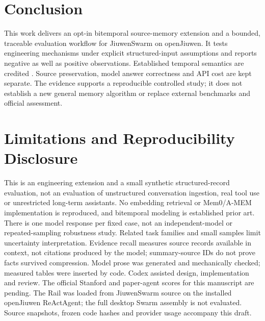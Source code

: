 \documentclass{article}
\begin{document}
\section{Conclusion}
This work delivers an opt-in bitemporal source-memory extension and a bounded, traceable evaluation workflow for JiuwenSwarm on openJiuwen. It tests engineering mechanisms under explicit structured-input assumptions and reports negative as well as positive observations. Established temporal semantics are credited \citep{temporal}. Source preservation, model answer correctness and API cost are kept separate. The evidence supports a reproducible controlled study; it does not establish a new general memory algorithm or replace external benchmarks and official assessment.
\section{Limitations and Reproducibility Disclosure}
This is an engineering extension and a small synthetic structured-record evaluation, not an evaluation of unstructured conversation ingestion, real tool use or unrestricted long-term assistants. No embedding retrieval or Mem0/A-MEM implementation is reproduced, and bitemporal modeling is established prior art. There is one model response per fixed case, not an independent-model or repeated-sampling robustness study. Related task families and small samples limit uncertainty interpretation. Evidence recall measures source records available in context, not citations produced by the model; summary-source IDs do not prove facts survived compression. Model prose was generated and mechanically checked; measured tables were inserted by code. Codex assisted design, implementation and review. The official Stanford and paper-agent scores for this manuscript are pending. The Rail was loaded from JiuwenSwarm source on the installed openJiuwen ReActAgent; the full desktop Swarm assembly is not evaluated. Source snapshots, frozen code hashes and provider usage accompany this draft.
\end{document}

